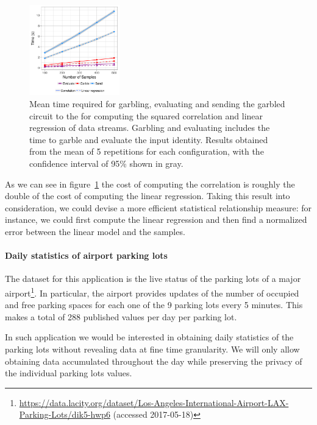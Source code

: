 \begin{figure}
  \includegraphics[width=0.35\textwidth]{plots/stream.png}
  \caption{Mean time required for garbling, evaluating and sending the garbled
    circuit to the \broker for computing the squared correlation and linear
    regression of data streams.  Garbling and evaluating includes the time to
    garble and evaluate the input identity.  Results obtained from the mean of
    5 repetitions for each configuration, with the confidence interval of 95\%
    shown in gray.}
  \label{stream-times}
\end{figure}

As we can see in figure~\ref{stream-times} the cost of computing the
correlation is roughly the double of the cost of computing the linear
regression.  Taking this result into consideration, we could devise a more
efficient statistical relationship measure: for instance, we could first
compute the linear regression and then find a normalized error between the
linear model and the samples.

\paragraph{Daily statistics of airport parking lots}

The dataset for this application is the live status of the parking lots of a
major
airport\footnote{\url{https://data.lacity.org/dataset/Los-Angeles-International-Airport-LAX-Parking-Lots/dik5-hwp6}
(accessed 2017-05-18)}.  In particular, the airport provides updates of the
number of occupied and free parking spaces for each one of the 9 parking lots
every 5 minutes.  This makes a total of 288 published values per day per
parking lot.

In such application we would be interested in obtaining daily statistics of the
parking lots without revealing data at fine time granularity.  We will only
allow obtaining data accumulated throughout the day while preserving the
privacy of the individual parking lots values.

